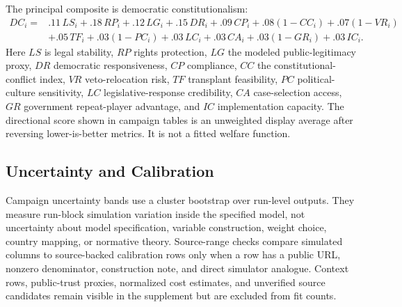 The principal composite is democratic constitutionalism:
\[
\begin{aligned}
DC_i ={}& .11\,LS_i + .18\,RP_i + .12\,LG_i + .15\,DR_i + .09\,CP_i
+ .08(1-CC_i) + .07(1-VR_i) \\
&+ .05\,TF_i + .03(1-PC_i) + .03\,LC_i + .03\,CA_i
+ .03(1-GR_i) + .03\,IC_i.
\end{aligned}
\]
Here $LS$ is legal stability, $RP$ rights protection, $LG$ the modeled public-legitimacy proxy, $DR$ democratic responsiveness, $CP$ compliance, $CC$ the constitutional-conflict index, $VR$ veto-relocation risk, $TF$ transplant feasibility, $PC$ political-culture sensitivity, $LC$ legislative-response credibility, $CA$ case-selection access, $GR$ government repeat-player advantage, and $IC$ implementation capacity. The directional score shown in campaign tables is an unweighted display average after reversing lower-is-better metrics. It is not a fitted welfare function.

\subsection*{Uncertainty and Calibration}

Campaign uncertainty bands use a cluster bootstrap over run-level outputs. They measure run-block simulation variation inside the specified model, not uncertainty about model specification, variable construction, weight choice, country mapping, or normative theory. Source-range checks compare simulated columns to source-backed calibration rows only when a row has a public URL, nonzero denominator, construction note, and direct simulator analogue. Context rows, public-trust proxies, normalized cost estimates, and unverified source candidates remain visible in the supplement but are excluded from fit counts.
